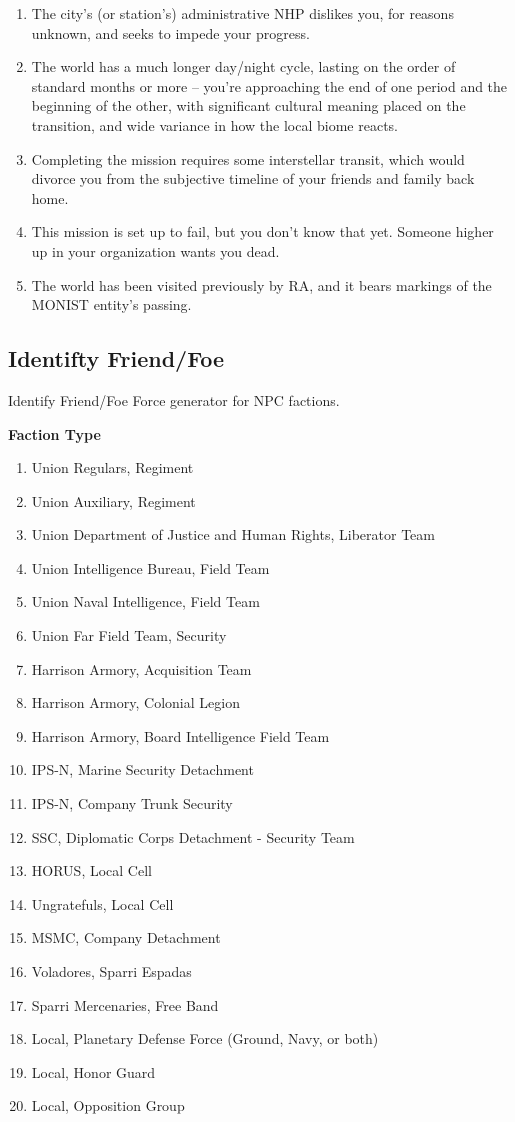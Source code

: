 \begin{enumerate}
    \item The city’s (or station’s) administrative NHP dislikes you, for reasons unknown, and seeks to impede your progress.
    \item The world has a much longer day/night cycle, lasting on the order of standard months or more -- you’re approaching the end of one period and the beginning of the other, with significant cultural meaning placed on the transition, and wide variance in how the local biome reacts.
    \item Completing the mission requires some interstellar transit, which would divorce you from the subjective timeline of your friends and family back home.
    \item This mission is set up to fail, but you don’t know that yet. Someone higher up in your organization wants you dead.
    \item The world has been visited previously by RA, and it bears markings of the MONIST entity's passing.
\end{enumerate}

\subsection{Identifty Friend/Foe}

Identify Friend/Foe
Force generator for NPC factions.

\textbf{Faction Type}
\begin{enumerate}
    \item Union Regulars, Regiment
    \item Union Auxiliary, Regiment
    \item Union Department of Justice and Human Rights, Liberator Team
    \item Union Intelligence Bureau, Field Team
    \item Union Naval Intelligence, Field Team
    \item Union Far Field Team, Security
    \item Harrison Armory, Acquisition Team
    \item Harrison Armory, Colonial Legion
    \item Harrison Armory, Board Intelligence Field Team
    \item IPS-N, Marine Security Detachment
    \item IPS-N, Company Trunk Security
    \item SSC, Diplomatic Corps Detachment - Security Team
    \item HORUS, Local Cell
    \item Ungratefuls, Local Cell
    \item MSMC, Company Detachment
    \item Voladores, Sparri Espadas
    \item Sparri Mercenaries, Free Band
    \item Local, Planetary Defense Force (Ground, Navy, or both)
    \item Local, Honor Guard
    \item Local, Opposition Group
\end{enumerate}


